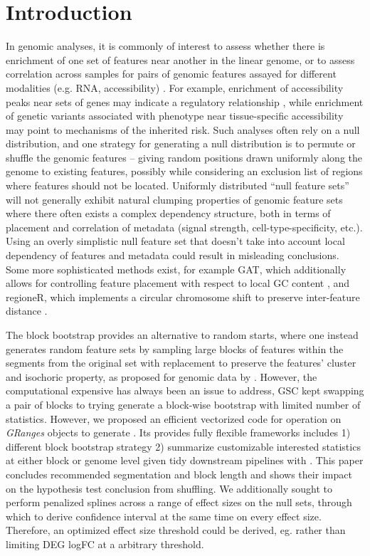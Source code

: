 \section{Introduction}
In genomic analyses, it is commonly of interest to assess whether
there is enrichment of one set of features near another in the
linear genome, or to assess correlation across samples for pairs of
genomic features assayed for different modalities (e.g. RNA,
accessibility) \citep{reviewdilemma2014}.
For example, enrichment of accessibility peaks near sets of genes may
indicate a regulatory relationship \citep{lee2020fluent}, while
enrichment of genetic variants associated with phenotype near
tissue-specific accessibility may point to mechanisms of the inherited
risk.
Such analyses often rely on a null distribution, and one strategy for
generating a null distribution is to permute or shuffle the
genomic features -- giving random positions drawn uniformly along the
genome to existing features, possibly while considering an exclusion
list of regions where features should not be located.
Uniformly distributed ``null feature sets'' will not generally exhibit
natural clumping properties of
genomic feature sets where there often exists a complex
dependency structure, both in terms of placement and correlation of
metadata (signal strength, cell-type-specificity, etc.).
Using an overly simplistic null feature set that doesn't take into
account local dependency of features and metadata could result in
misleading conclusions.
Some more sophisticated methods exist, for example
GAT, which additionally allows for controlling feature placement with
respect to local GC content
\citep{GAT_2013}, and regioneR, which implements a circular chromosome
shift to preserve inter-feature distance \citep{gel2016regioner}.

The block bootstrap \citep{politis1999subsampling}
provides an alternative to random starts, where one instead generates
random feature sets by sampling large blocks of features within the
segments from the original set with replacement to preserve the
features' cluster and isochoric property, as proposed for genomic data
by \citet{bickel2010subsampling}.
However, the computational expensive has always been an issue to address, GSC
\citep{bickel2010subsampling} kept swapping a pair of blocks to trying
generate a block-wise bootstrap with limited number of statistics.
However, we proposed an efficient vectorized code for operation on
\emph{GRanges}\xspace \citep{lawrence2013software} objects to generate
\bootranges. Its provides fully flexible frameworks includes 1)
different block bootstrap strategy 2) summarize customizable
interested statistics at either block or genome level given tidy
downstream pipelines with \plyranges \citep{lee2019plyranges}. This
paper concludes recommended segmentation and block length and shows
their impact on the hypothesis test conclusion from shuffling.  We
additionally sought to perform penalized splines across a range of
effect sizes on the null sets, through which to derive confidence
interval at the same time on every effect size. Therefore, an
optimized effect size threshold could be derived, eg. rather than
limiting DEG logFC at a arbitrary threshold.

